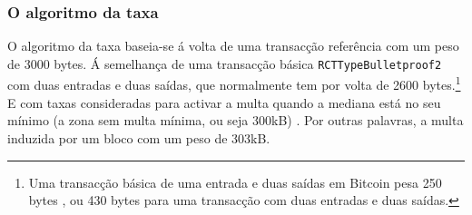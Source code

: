 
\subsubsection*{O algoritmo da taxa}

O algoritmo da taxa baseia-se á volta de uma transacção referência com um peso de 3000 bytes. Á semelhança de uma transacção básica {\tt RCTTypeBulletproof2} com duas entradas e duas saídas, que normalmente tem por volta de 2600 bytes.\footnote{Uma transacção básica de uma entrada e duas saídas em Bitcoin pesa 250 bytes \cite{bitcoin-txsizes-2015}, ou 430 bytes para uma transacção com duas entradas e duas saídas.}
E com taxas consideradas para activar a multa quando a mediana está no seu mínimo (a zona sem multa mínima, ou seja 300kB) \cite{articmine-36c3-dynamics}. Por outras palavras, a multa induzida por um bloco com um peso de 303kB. 

